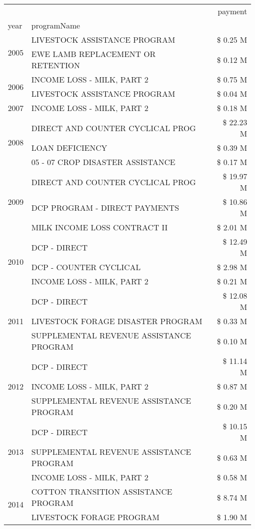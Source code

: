 \begin{tabular}{llr}
\toprule
 &  & payment \\
year & programName &  \\
\midrule
\multirow[t]{2}{*}{2005} & LIVESTOCK ASSISTANCE PROGRAM & \$ 0.25 M \\
 & EWE LAMB REPLACEMENT OR RETENTION & \$ 0.12 M \\
\cline{1-3}
\multirow[t]{2}{*}{2006} & INCOME LOSS - MILK, PART 2 & \$ 0.75 M \\
 & LIVESTOCK ASSISTANCE PROGRAM & \$ 0.04 M \\
\cline{1-3}
2007 & INCOME LOSS - MILK, PART 2 & \$ 0.18 M \\
\cline{1-3}
\multirow[t]{3}{*}{2008} & DIRECT AND COUNTER CYCLICAL PROG & \$ 22.23 M \\
 & LOAN DEFICIENCY & \$ 0.39 M \\
 & 05 - 07 CROP DISASTER ASSISTANCE & \$ 0.17 M \\
\cline{1-3}
\multirow[t]{3}{*}{2009} & DIRECT AND COUNTER CYCLICAL PROG & \$ 19.97 M \\
 & DCP PROGRAM - DIRECT PAYMENTS & \$ 10.86 M \\
 & MILK INCOME LOSS CONTRACT II & \$ 2.01 M \\
\cline{1-3}
\multirow[t]{3}{*}{2010} & DCP - DIRECT & \$ 12.49 M \\
 & DCP - COUNTER CYCLICAL & \$ 2.98 M \\
 & INCOME LOSS - MILK, PART 2 & \$ 0.21 M \\
\cline{1-3}
\multirow[t]{3}{*}{2011} & DCP - DIRECT & \$ 12.08 M \\
 & LIVESTOCK FORAGE DISASTER PROGRAM & \$ 0.33 M \\
 & SUPPLEMENTAL REVENUE ASSISTANCE PROGRAM & \$ 0.10 M \\
\cline{1-3}
\multirow[t]{3}{*}{2012} & DCP - DIRECT & \$ 11.14 M \\
 & INCOME LOSS - MILK, PART 2 & \$ 0.87 M \\
 & SUPPLEMENTAL REVENUE ASSISTANCE PROGRAM & \$ 0.20 M \\
\cline{1-3}
\multirow[t]{3}{*}{2013} & DCP - DIRECT & \$ 10.15 M \\
 & SUPPLEMENTAL REVENUE ASSISTANCE PROGRAM & \$ 0.63 M \\
 & INCOME LOSS - MILK, PART 2 & \$ 0.58 M \\
\cline{1-3}
\multirow[t]{3}{*}{2014} & COTTON TRANSITION ASSISTANCE PROGRAM & \$ 8.74 M \\
 & LIVESTOCK FORAGE PROGRAM & \$ 1.90 M \\

\end{tabular}

